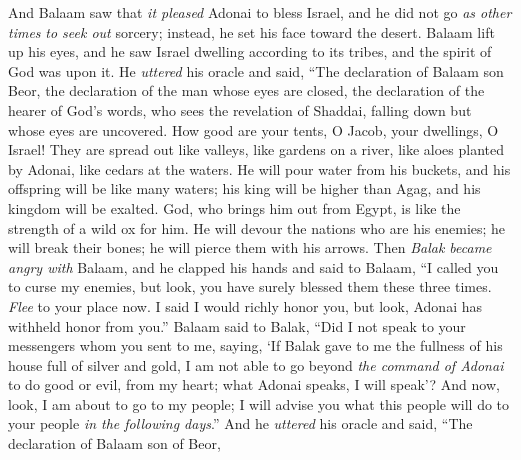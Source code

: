 \begin{biblechapter} %
 And Balaam saw that \textit{it pleased} Adonai to bless Israel, and he did not go \textit{as other times} \textit{to seek out} sorcery; instead, he set his face toward the desert.
\verse Balaam lift up his eyes, and he saw Israel dwelling according to its tribes, and the spirit of God was upon it.
\verse He \textit{uttered} his oracle and said,
\verse “The declaration of Balaam son Beor, 
the declaration of the man whose eyes are closed,
\verse the declaration of the hearer of God’s words, 
who sees the revelation of Shaddai, 
falling down but whose eyes are uncovered.
\verse How good are your tents, O Jacob, 
your dwellings, O Israel!
\verse They are spread out like valleys, 
like gardens on a river, 
like aloes planted by Adonai, 
like cedars at the waters.
\verse He will pour water from his buckets, 
and his offspring will be like many waters; 
his king will be higher than Agag, 
and his kingdom will be exalted.
\verse God, who brings him out from Egypt, 
is like the strength of a wild ox for him. 
He will devour the nations who are his enemies; 
he will break their bones; 
he will pierce them with his arrows.
\verse Then \textit{Balak became angry with} Balaam, and he clapped his hands and said to Balaam, “I called you to curse my enemies, but look, you have surely blessed them these three times.
\verse \textit{Flee} to your place now. I said I would richly honor you, but look, Adonai has withheld honor from you.”
\verse Balaam said to Balak, “Did I not speak to your messengers whom you sent to me, saying,
\verse ‘If Balak gave to me the fullness of his house full of silver and gold, I am not able to go beyond \textit{the command of Adonai} to do good or evil, from my heart; what Adonai speaks, I will speak’?
\verse And now, look, I am about to go to my people; I will advise you what this people will do to your people \textit{in the following days}.”
\verse And he \textit{uttered} his oracle and said,
\verse “The declaration of Balaam son of Beor, 

\end{biblechapter}

